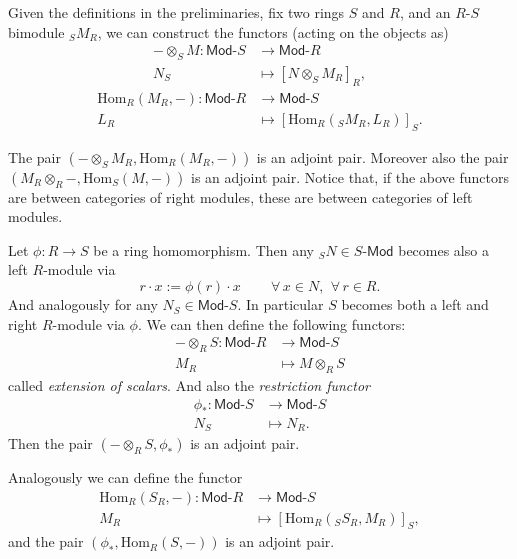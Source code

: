 \begin{rem}[]
	Given the definitions in the preliminaries, fix two rings $S$ and $R$, and an $R$-$S$ bimodule ${}_SM_R$,
	we can construct the functors (acting on the objects as)
	\begin{align}
		- \otimes_S M: \mathsf{Mod}\text{-}S &\to \mathsf{Mod}\text{-}R \\
		 N_S &\mapsto \left[ N \otimes_S M_R \right]_R
	,\end{align}
	\begin{align}
		\mathrm{Hom}_{R} \left( M_R, - \right): \mathsf{Mod}\text{-}R &\to \mathsf{Mod}\text{-}S \\
		L_R &\mapsto \left[ \mathrm{Hom}_{R}\left( {}_SM_R, L_R \right)\right]_S
	.\end{align} 	
\end{rem}

\begin{prop}
	The pair $\left(- \otimes_S M_R, \mathrm{Hom}_{R}\left( M_R, - \right)\right)$
	is an adjoint pair.
	Moreover also the pair $\left(M_R \otimes_R -, \mathrm{Hom}_{S}\left( M, - \right) \right)$ is an adjoint pair.
	Notice that, if the above functors are between categories of right modules,
	these are between categories of left modules.
\end{prop} 

\begin{ex}
	Let $\phi: R \to S$ be a ring homomorphism.
	Then any ${}_SN \in S\text{-}\mathsf{Mod}$ becomes also a left $R$-module via
	\begin{equation}
		r \cdot x := \phi(r) \cdot x \qquad \,\forall\, x \in N,\ \,\forall\, r \in R
	.\end{equation} 
	And analogously for any $N_S \in \mathsf{Mod}\text{-}S$.
	In particular $S$ becomes both a left and right $R$-module via $\phi$.
	We can then define the following functors:
	\begin{align}
		-\otimes_R S: \mathsf{Mod}\text{-}R &\to \mathsf{Mod}\text{-}S \\
		M_R &\mapsto M \otimes_R S
	\end{align} 
	called \textit{extension of scalars}.
	And also the \textit{restriction functor}
	\begin{align}
		\phi_*: \mathsf{Mod}\text{-}S &\to \mathsf{Mod}\text{-}S \\
		N_S &\mapsto N_R
	.\end{align} 
	Then the pair $\left(- \otimes_R S, \phi_*\right)$ is an adjoint pair.

	Analogously we can define the functor
	\begin{align}
		\mathrm{Hom}_{ R}\left( S_R, - \right): \mathsf{Mod}\text{-}R &\to \mathsf{Mod}\text{-}S\\
		M_R &\mapsto \left[ \mathrm{Hom}_{R}\left({}_SS_R, M_R \right) \right]_S
	,\end{align} 
	and the pair $\left(\phi_*, \mathrm{Hom}_{ R}\left( S, - \right)\right)$ is an adjoint pair.
\end{ex} 	

